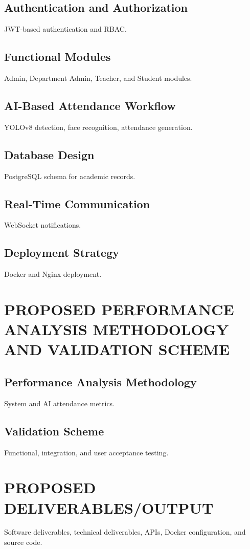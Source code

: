 \documentclass[12pt,a4paper]{report}
\begin{document}
\section{Authentication and Authorization}
JWT-based authentication and RBAC.

\section{Functional Modules}
Admin, Department Admin, Teacher, and Student modules.

\section{AI-Based Attendance Workflow}
YOLOv8 detection, face recognition, attendance generation.

\section{Database Design}
PostgreSQL schema for academic records.

\section{Real-Time Communication}
WebSocket notifications.

\section{Deployment Strategy}
Docker and Nginx deployment.

\clearpage
\chapter{PROPOSED PERFORMANCE ANALYSIS METHODOLOGY AND VALIDATION SCHEME}

\section{Performance Analysis Methodology}
System and AI attendance metrics.

\section{Validation Scheme}
Functional, integration, and user acceptance testing.

\clearpage
\chapter{PROPOSED DELIVERABLES/OUTPUT}
Software deliverables, technical deliverables, APIs, Docker configuration, and source code.
\end{document}
